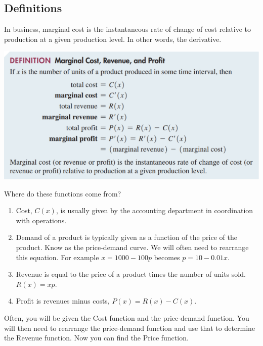 \documentclass[14pt]{extarticle}
\begin{document}
\subsection{Definitions}
In business, marginal cost is the instantaneous rate of change of cost relative to production at a given production level. In other words, the derivative.
\begin{center}
	\includegraphics[width=0.9\linewidth]{9-7-1}
\end{center}
Where do these functions come from?
\begin{enumerate}
	\item Cost, $C(x)$, is usually given by the accounting department in coordination with operations.
	\item Demand of a product is typically given as a function of the price of the product. Know as the price-demand curve. We will often need to rearrange this equation. For example $x = 1000 - 100p$ becomes $p = 10-0.01x$.
	\item Revenue is equal to the price of a product times the number of units sold. $R(x)= xp$.
	\item Profit is revenues minus costs, $P(x) = R(x) - C(x)$.
\end{enumerate}
Often, you will be given the Cost function and the price-demand function. You will then need to rearrange the price-demand function and use that to determine the Revenue function. Now you can find the Price function.
\end{document}
